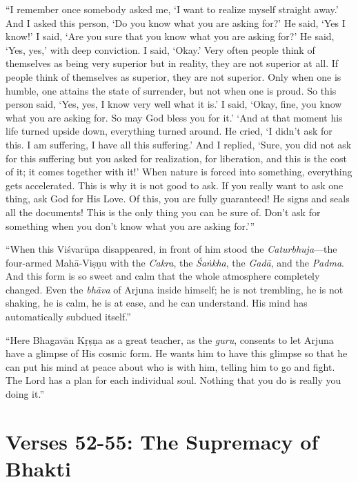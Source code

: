 \enquote{I remember once somebody asked me, \enquote{I want to realize myself straight away.} And I asked this person, \enquote{Do you know what you are asking for?} He said, \enquote{Yes I know!} I said, \enquote{Are you sure that you know what you are asking for?} He said, \enquote{Yes, yes,} with deep conviction. I said, \enquote{Okay.} Very often people think of themselves as being very superior but in reality, they are not superior at all. If people think of themselves as superior, they are not superior. Only when one is humble, one attains the state of surrender, but not when one is proud. So this person said, \enquote{Yes, yes, I know very well what it is.} I said, \enquote{Okay, fine, you know what you are asking for. So may God bless you for it.} \enquote{And at that moment his life turned upside down, everything turned around. He cried, ‘I didn’t ask for this. I am suffering, I have all this suffering.’ And I replied, ‘Sure, you did not ask for this suffering but you asked for realization, for liberation, and this is the cost of it; it comes together with it!’ When nature is forced into something, everything gets accelerated. This is why it is not good to ask. If you really want to ask one thing, ask God for His Love. Of this, you are fully guaranteed! He signs and seals all the documents! This is the only thing you can be sure of. Don’t ask for something when you don’t know what you are asking for.}}

\enquote{When this Viśvarūpa disappeared, in front of him stood the \textit{Caturbhuja}---the four-armed Mahā-Viṣṇu with the \textit{Cakra}, the \textit{Śaṅkha}, the \textit{Gadā}, and the \textit{Padma}. And this form is so sweet and calm that the whole atmosphere completely changed. Even the \textit{bhāva} of Arjuna inside himself; he is not trembling, he is not shaking, he is calm, he is at ease, and he can understand. His mind has automatically subdued itself.}

\enquote{Here Bhagavān Kṛṣṇa as a great teacher, as the \textit{guru}, consents to let Arjuna have a glimpse of His cosmic form. He wants him to have this glimpse so that he can put his mind at peace about who is with him, telling him to go and fight. The Lord has a plan for each individual soul. Nothing that you do is really you doing it.}


\section{Verses 52-55: The Supremacy of Bhakti}\label{sec-verses-52-55-the-supremacy-of-bhakti}



